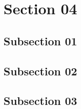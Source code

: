 \section{Section 04}
\subsection{Subsection 01}
\lipsum[1-5]
\subsection{Subsection 02}
\lipsum[1-5]
\subsection{Subsection 03}
\lipsum[1-5]

